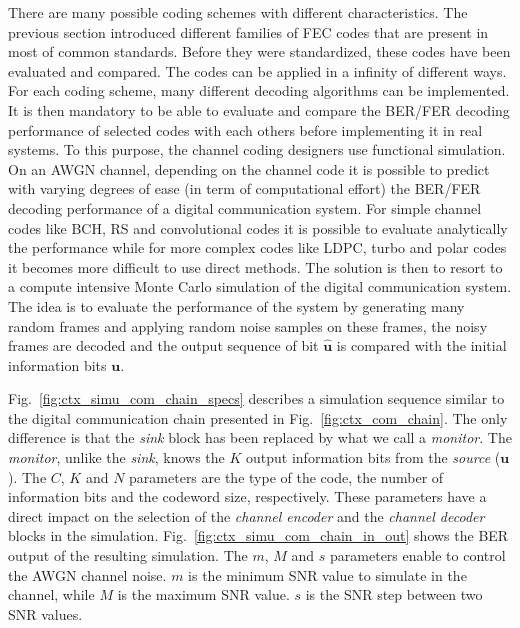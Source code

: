 There are many possible coding schemes with different characteristics. The
previous section introduced different families of FEC codes that are present in
most of common standards. Before they were standardized, these codes have been
evaluated and compared. The codes can be applied in a infinity of different
ways. For each coding scheme, many different decoding algorithms can be
implemented. It is then mandatory to be able to evaluate and compare the BER/FER
decoding performance of selected codes with each others before implementing it
in real systems. To this purpose, the channel coding designers use functional
simulation. On an AWGN channel, depending on the channel code it is possible to
predict with varying degrees of ease (in term of computational effort) the
BER/FER decoding performance of a digital communication system. For simple
channel codes like BCH, RS and convolutional codes it is possible to evaluate
analytically the performance while for more complex codes like LDPC, turbo and
polar codes it becomes more difficult to use direct methods. The solution is
then to resort to a compute intensive Monte Carlo simulation of the digital
communication system. The idea is to evaluate the performance of the system by
generating many random frames and applying random noise samples on these frames,
the noisy frames are decoded and the output sequence of bit $\bm{\hat{u}}$ is
compared with the initial information bits $\bm{u}$.

Fig.~\ref{fig:ctx_simu_com_chain_specs} describes a simulation sequence similar
to the digital communication chain presented in Fig.~\ref{fig:ctx_com_chain}.
The only difference is that the \emph{sink} block has been replaced by what we
call a \emph{monitor}. The \emph{monitor}, unlike the \emph{sink}, knows the $K$
output information bits from the \emph{source} ($\bm{u}$). The $C$, $K$ and $N$
parameters are the type of the code, the number of information bits and the
codeword size, respectively. These parameters have a direct impact on the
selection of the \emph{channel encoder} and the \emph{channel decoder} blocks
in the simulation. Fig.~\ref{fig:ctx_simu_com_chain_in_out} shows the BER output
of the resulting simulation. The $m$, $M$ and $s$ parameters enable to control
the AWGN channel noise. $m$ is the minimum SNR value to simulate in the channel,
while $M$ is the maximum SNR value. $s$ is the SNR step between two SNR values.

